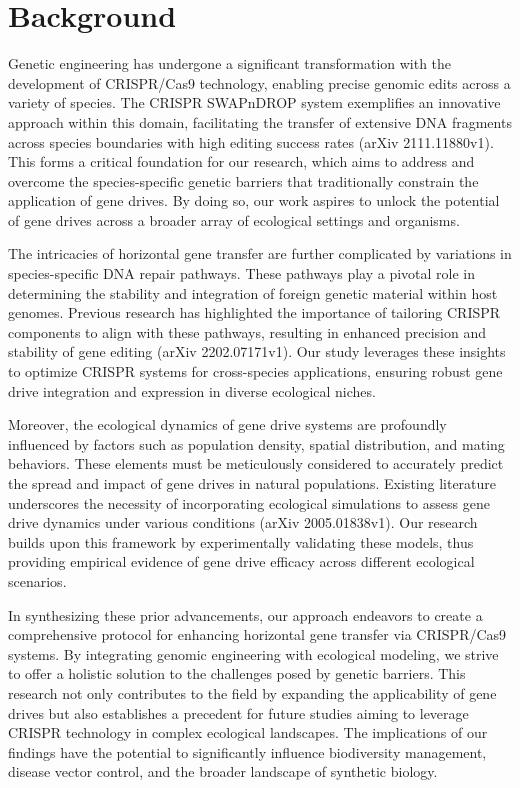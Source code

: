 \documentclass{article}
\begin{document}
\section{Background}
Genetic engineering has undergone a significant transformation with the development of CRISPR/Cas9 technology, enabling precise genomic edits across a variety of species. The CRISPR SWAPnDROP system exemplifies an innovative approach within this domain, facilitating the transfer of extensive DNA fragments across species boundaries with high editing success rates (arXiv 2111.11880v1). This forms a critical foundation for our research, which aims to address and overcome the species-specific genetic barriers that traditionally constrain the application of gene drives. By doing so, our work aspires to unlock the potential of gene drives across a broader array of ecological settings and organisms.

The intricacies of horizontal gene transfer are further complicated by variations in species-specific DNA repair pathways. These pathways play a pivotal role in determining the stability and integration of foreign genetic material within host genomes. Previous research has highlighted the importance of tailoring CRISPR components to align with these pathways, resulting in enhanced precision and stability of gene editing (arXiv 2202.07171v1). Our study leverages these insights to optimize CRISPR systems for cross-species applications, ensuring robust gene drive integration and expression in diverse ecological niches.

Moreover, the ecological dynamics of gene drive systems are profoundly influenced by factors such as population density, spatial distribution, and mating behaviors. These elements must be meticulously considered to accurately predict the spread and impact of gene drives in natural populations. Existing literature underscores the necessity of incorporating ecological simulations to assess gene drive dynamics under various conditions (arXiv 2005.01838v1). Our research builds upon this framework by experimentally validating these models, thus providing empirical evidence of gene drive efficacy across different ecological scenarios.

In synthesizing these prior advancements, our approach endeavors to create a comprehensive protocol for enhancing horizontal gene transfer via CRISPR/Cas9 systems. By integrating genomic engineering with ecological modeling, we strive to offer a holistic solution to the challenges posed by genetic barriers. This research not only contributes to the field by expanding the applicability of gene drives but also establishes a precedent for future studies aiming to leverage CRISPR technology in complex ecological landscapes. The implications of our findings have the potential to significantly influence biodiversity management, disease vector control, and the broader landscape of synthetic biology.
\end{document}
